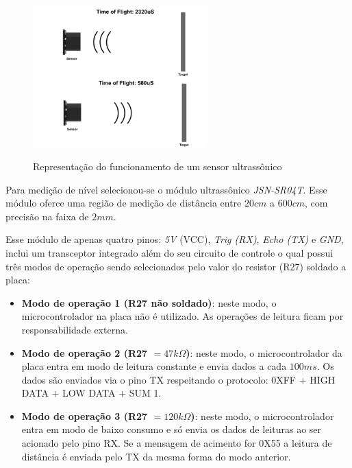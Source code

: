 \begin{figure}[H]
	\centering
	\caption{Representação do funcionamento de um sensor ultrassônico}
	\includegraphics[width=0.6\textwidth]{figuras/ultrassonico_operacao.png}
	\label{fig:operacao_ultrassonico}
\end{figure}

Para medição de nível selecionou-se o módulo ultrassônico \textit{JSN-SR04T}. Esse módulo oferce uma região de medição de distância entre $20 cm$ a $600 cm$, com precisão na faixa de $2 mm$.

Esse módulo de apenas quatro pinos: \textit{5V} (VCC), \textit{Trig (RX)}, \textit{Echo (TX)} e \textit{GND}, inclui um transceptor integrado além do seu circuito de controle o qual possui três modos de operação sendo selecionados pelo valor do resistor (R27) soldado a placa:


\begin{itemize}
	\item \textbf{Modo de operação 1 (R27 não soldado)}: neste modo, o microcontrolador na placa não é utilizado. As operações de leitura ficam por responsabilidade externa. 
	
	\item \textbf{Modo de operação 2 (R27 $= 47k\Omega$)}: neste modo, o microcontrolador da placa entra em modo de leitura constante e envia dados a cada $100ms$. Os dados são enviados via o pino TX respeitando o protocolo: 0XFF + HIGH DATA + LOW DATA + SUM 1.
	
	\item \textbf{Modo de operação 3 (R27 $= 120k\Omega$)}: neste modo, o microcontrolador entra em modo de baixo consumo e só envia os dados de leituras ao ser acionado pelo pino RX. Se a mensagem de acimento for 0X55 a leitura de distância é enviada pelo TX da mesma forma do modo anterior. \\
\end{itemize}

